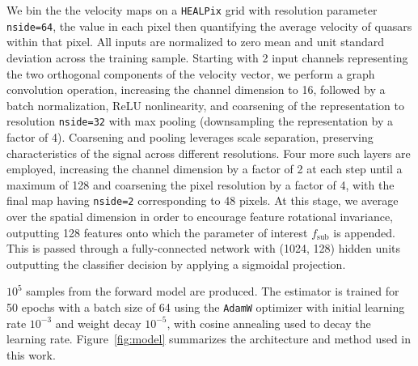 \documentclass[]{article}
\begin{document}
We bin the the velocity maps on a \texttt{HEALPix} grid with resolution parameter \texttt{nside=64}, the value in each pixel then quantifying the average velocity of quasars within that pixel. All inputs are normalized to zero mean and unit standard deviation across the training sample. Starting with 2 input channels representing the two orthogonal components of the velocity vector, we perform a graph convolution operation, increasing the channel dimension to 16, followed by a batch normalization, ReLU nonlinearity, and coarsening of the representation to resolution \texttt{nside=32} with max pooling (downsampling the representation by a factor of 4). Coarsening and pooling leverages scale separation, preserving characteristics of the signal across different resolutions. Four more such layers are employed, increasing the channel dimension by a factor of 2 at each step until a maximum of 128 and coarsening the pixel resolution by a factor of 4, with the final map having \texttt{nside=2} corresponding to 48 pixels. At this stage, we average over the spatial dimension in order to encourage feature rotational invariance, outputting 128 features onto which the parameter of interest $f_\mathrm{sub}$ is appended. This is passed through a fully-connected network with (1024, 128) hidden units outputting the classifier decision by applying a sigmoidal projection.

$10^5$ samples from the forward model are produced. The estimator is trained for 50 epochs with a batch size of 64 using the \texttt{AdamW} optimizer with initial learning rate $10^{-3}$ and weight decay $10^{-5}$, with cosine annealing used to decay the learning rate. Figure~\ref{fig:model} summarizes the architecture and method used in this work.

\end{document}
